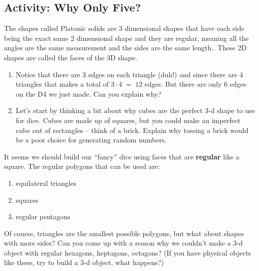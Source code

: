 \subsection{Activity: Why Only Five?}
The shapes called Platonic solids are 3 dimensional shapes that have each side being the exact same 2 dimensional shape and they are regular, meaning all the angles are the same measurement and the sides are the same length.. These 2D shapes are called the faces of the 3D shape.
\begin{enumerate}

\item Notice that there are 3 edges on each triangle (duh!) and since there are 4 triangles that makes a total of $3 \cdot 4 \; = \; 12$ edges.  But there are only 6 edges on the D4 we just made.  Can you explain why?



\wbvfill



\item Let's start by thinking a bit about why cubes are the perfect 3-d shape to use for dice.  Cubes are made up of squares, but you could make an imperfect cube out of rectangles -- think of a brick.  Explain why tossing a brick would be a poor choice for generating random numbers.
\end{enumerate}
\wbvfill

\wbnewpage
It seems we should build our ``fancy'' dice using faces that are {\bf regular} like a square.  The regular polygons that can be used are:

\begin{enumerate}
    \item equilateral triangles
    \item squares
    \item regular pentagons
\end{enumerate}

Of course, triangles are the smallest possible polygons, but what about shapes with more sides?  Can you come up with a reason why we couldn't make a 3-d object with regular hexagons, heptagons, octagons? (If you have physical objects like these, try to build a 3-d object, what happens?)

